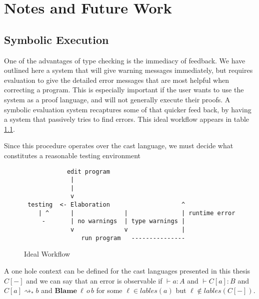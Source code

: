 \chapter{Notes and Future Work}
\label{chapter:Notes}
\thispagestyle{myheadings}


\section{Symbolic Execution}

One of the advantages of type checking is the immediacy of feedback.
We have outlined here a system that will give warning messages immediately,
but requires evaluation to give the detailed error messages that are
most helpful when correcting a program. This is especially important
if the user wants to use the system as a proof language, and will
not generally execute their proofs. A symbolic evaluation system recaptures
some of that quicker feed back, by having a system that passively
tries to find errors. This ideal workflow appears in table \ref{fig:notes-workflow}.

Since this procedure operates over the cast language, we must decide
what constitutes a reasonable testing environment

\begin{figure}
\begin{lstlisting}
            edit program
             |      
             |      
             v
 testing  <- Elaboration                    ^
    | ^      |              |               | runtime error
     -       | no warnings  | type warnings |
             v              v               |
                run program   ---------------
\end{lstlisting}


\caption{Ideal Workflow}
\label{fig:notes-workflow}
\end{figure}

A one hole context can be defined
for the cast languages presented in this thesis $C[-]$ and we can
say that an error is observable if $\vdash a:A$ and $\vdash C[a]:B$
and $C[a]\rightsquigarrow_{*}b$ and $\textbf{Blame}\:\ensuremath{\ell}\,o\,b$
for some $\ensuremath{\ell}\in lables\left(a\right)$ but $\ensuremath{\ell}\notin lables\left(C[-]\right)$.

